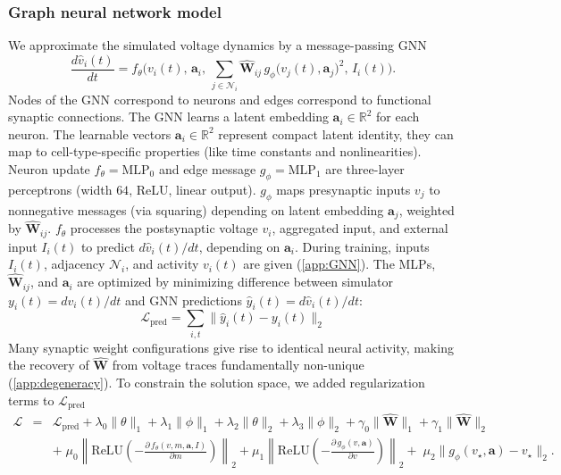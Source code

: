 \documentclass{article}
\begin{document}
\subsubsection*{Graph neural network model} \label{method:GNN}
We approximate the simulated voltage dynamics by a message-passing GNN \citep{gilmer_neural_2017}
\begin{equation}
\frac{d\hat{v}_i(t)}{dt}
= f_\theta\!\Big(v_i(t),\,\mathbf{a}_i,\,
\sum_{j\in\mathcal{N}_i} \hat{\mathbf{W}}_{ij}\,
g_\phi\!\big(v_j(t),\mathbf{a}_j\big)^2,\,
I_i(t)\Big).
\label{eq:gnn_ct}
\end{equation}
Nodes of the GNN correspond to neurons and edges correspond to functional synaptic connections. The GNN learns a latent embedding $\mathbf{a}_i\in\mathbb{R}^2$ for each neuron. The learnable vectors $\mathbf{a}_i\in\mathbb{R}^2$ represent compact latent identity, they can map to cell-type-specific properties (like time constants and nonlinearities). Neuron update $f_\theta=\text{MLP}_0$ and edge message $g_\phi=\text{MLP}_1$ are three-layer perceptrons (width $64$, ReLU, linear output). $g_\phi$ maps presynaptic inputs $v_j$ to nonnegative messages (via squaring) depending on latent embedding $\mathbf{a}_j$, weighted by $\hat{\mathbf{W}}_{ij}$. $f_\theta$ processes the postsynaptic voltage $v_i$, aggregated input, and external input $I_i(t)$ to predict $d\hat{v}_i(t)/dt$, depending on $\mathbf{a}_i$. During training, inputs $I_i(t)$, adjacency $\mathcal{N}_i$, and activity $v_i(t)$ are given (\cref{app:GNN}). The MLPs, $\hat{\mathbf{W}}_{ij}$, and $\mathbf{a}_i$ are optimized by minimizing difference between simulator $y_i(t)=dv_i(t)/dt$ and GNN predictions $\hat{y}_i(t)=d\hat{v}_i(t)/dt$:
\begin{equation}
\mathcal{L}_{\mathrm{pred}} = \sum_{i,t}\|\hat{y}_i(t) - y_i(t)\|_2
\label{eq:loss_pred}
\end{equation}
Many synaptic weight configurations give rise to identical neural activity, making the recovery of $\hat{\mathbf{W}}$ from voltage traces fundamentally non-unique (\cref{app:degeneracy}). To constrain the solution space, we added regularization terms to $\mathcal{L}_{\mathrm{pred}}$
\begin{eqnarray}
\mathcal{L} &=& \mathcal{L}_{\mathrm{pred}}
+ \lambda_0\|\theta\|_1 + \lambda_1\|\phi\|_1 + \lambda_2\|\theta\|_2 + \lambda_3\|\phi\|_2
+ \gamma_0\|\hat{\mathbf{W}}\|_1 + \gamma_1\|\hat{\mathbf{W}}\|_2 \nonumber\\
&& +\; \mu_0\!\left\|\mathrm{ReLU}\!\left(-\tfrac{\partial\,f_\theta(v,m,\mathbf{a},I)}{\partial m}\right)\right\|_2
+ \mu_1\!\left\|\mathrm{ReLU}\!\left(-\tfrac{\partial\,g_\phi(v,\mathbf{a})}{\partial v}\right)\right\|_2 \nonumber +\; \mu_2\|g_\phi(v_\star,\mathbf{a})-v_\star\|_2.
\label{eq:loss_full}
\end{eqnarray}
\end{document}
